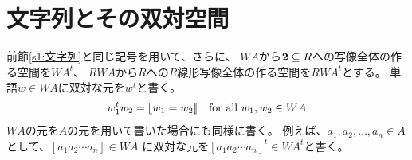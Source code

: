 \section{文字列とその双対空間}\label{s1:文字列とその双対空間} %
	前節\ref{s1:文字列}と同じ記号を用いて、さらに、
	$WA$から${\mathbf{2}}\subseteq R$への写像全体の作る空間を$WA^t$、
	$RWA$から$R$への$R$線形写像全体の作る空間を$RWA^t$とする。
	単語$w\in WA$に双対な元を$w^t$と書く。
	\begin{equation*}\begin{split} %
		w_1^tw_2 = \jump{w_1=w_2} \quad\text{for all }w_1,w_2\in WA
	\end{split}\end{equation*} %
	$WA$の元を$A$の元を用いて書いた場合にも同様に書く。
	例えば、$a_1,a_2,\dots, a_n\in A$として、$[a_1a_2\cdots a_n]\in WA$
	に双対な元を$[a_1a_2\cdots a_n]^t\in WA^t$と書く。


